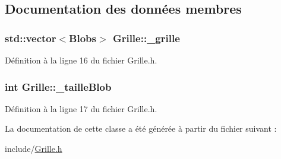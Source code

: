 \subsection{Documentation des données membres}
\hypertarget{a00009_a4d8c997595fcd22c7505e470e8633cd7}{
\subsubsection[{\_\-grille}]{\setlength{\rightskip}{0pt plus 5cm}std::vector$<${\bf Blobs}$>$ {\bf Grille::\_\-grille}}}
\label{a00009_a4d8c997595fcd22c7505e470e8633cd7}


Définition à la ligne 16 du fichier Grille.h.

\hypertarget{a00009_a8be16edd283bc90ff878489491cd496d}{
\subsubsection[{\_\-tailleBlob}]{\setlength{\rightskip}{0pt plus 5cm}int {\bf Grille::\_\-tailleBlob}}}
\label{a00009_a8be16edd283bc90ff878489491cd496d}


Définition à la ligne 17 du fichier Grille.h.



La documentation de cette classe a été générée à partir du fichier suivant :\begin{DoxyCompactItemize}
\item 
include/\hyperlink{a00026}{Grille.h}\end{DoxyCompactItemize}
